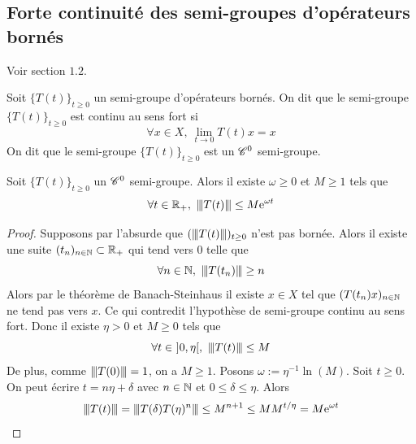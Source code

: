 \subsection{Forte continuité des semi-groupes d'opérateurs bornés}
Voir \cite{Pazy1983} section $1.2$.
\begin{definition}
    Soit $\big\{T(t)\big\}_{t \geq 0}$ un semi-groupe d'opérateurs bornés. On dit que le semi-groupe $\big\{T(t)\big\}_{t \geq 0}$ est \textcolor{astral}{continu au sens fort} si 
    \begin{equation*}
        \forall x \in X, \ \lim_{t \to 0} T(t)x=x
    \end{equation*}
    On dit que le semi-groupe $\big\{T(t)\big\}_{t \geq 0}$ est un \textcolor{astral}{$\mathscr{C}^0$ semi-groupe}.
\end{definition}

\begin{theorem}\label{thm_estimation_SG}
    Soit $\big\{T(t)\big\}_{t \geq 0}$ un $\mathscr{C}^0$ semi-groupe. Alors il existe $\omega \geq 0$ et $M \geq 1$ tels que 
    \begin{equation*}
        \forall t \in \bbR_+, \ \vertiii{T(t)} \leq M\ex^{\omega t}
    \end{equation*}
\end{theorem}

\begin{proof}
    Supposons par l'absurde que $({\left\vert\kern-0.25ex\left\vert \kern-0.25ex\left\vert T(t) \right\vert\kern-0.25ex\right\vert\kern-0.25ex\right\vert})_{t \geq 0}$ n'est pas bornée. Alors il existe une suite $(t_n)_{n \in \mathbb{N}} \subset \mathbb{R}_+$ qui tend vers $0$ telle que 
    \begin{equation*}
        \forall n \in \bbN, \ \vertiii{T(t_n)} \geq n
    \end{equation*}
    Alors par le théorème de Banach-Steinhaus il existe $x \in X$ tel que $(T(t_n)x)_{n \in \mathbb{N}}$ ne tend pas vers $x$. Ce qui contredit l'hypothèse de semi-groupe continu au sens fort. Donc il existe $\eta >0$ et $M\geq 0$ tels que 
    \begin{equation*}
        \forall t \in \ ]0,\eta[, \ \vertiii{T(t)} \leq M
    \end{equation*}
    De plus, comme ${\left\vert\kern-0.25ex\left\vert \kern-0.25ex\left\vert T(0) \right\vert\kern-0.25ex\right\vert\kern-0.25ex\right\vert}=1$, on a $M \geq 1$. Posons $\omega :=\eta^{-1}\ln{(M)}$. Soit $t \geq 0$. On peut écrire $t=n\eta+\delta$ avec $n \in \mathbb{N}$ et $0 \leq \delta \leq \eta$. Alors 
    \begin{equation*}
        {\left\vert\kern-0.25ex\left\vert \kern-0.25ex\left\vert T(t) \right\vert\kern-0.25ex\right\vert\kern-0.25ex\right\vert} = {\left\vert\kern-0.25ex\left\vert \kern-0.25ex\left\vert T(\delta)T(\eta)^n \right\vert\kern-0.25ex\right\vert\kern-0.25ex\right\vert} \leq M^{n+1} \leq MM^{t/\eta} = M\mathrm{e}^{\omega t}
    \end{equation*}
\end{proof}

